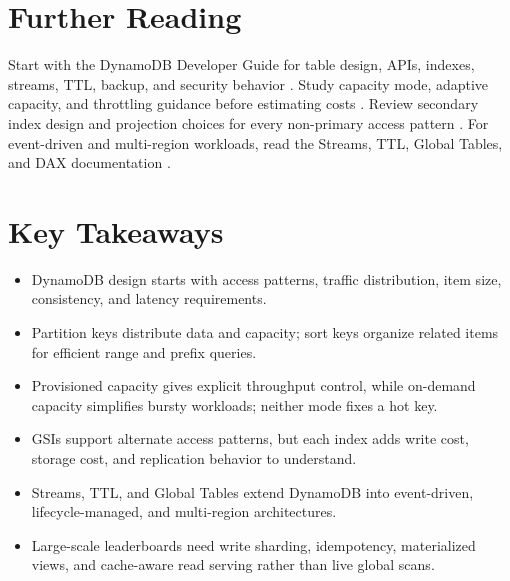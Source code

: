 \section{Further Reading}
Start with the DynamoDB Developer Guide for table design, APIs, indexes, streams, TTL, backup, and security behavior \cite{awsDynamoDBDeveloperGuide}. Study capacity mode, adaptive capacity, and throttling guidance before estimating costs \cite{awsDynamoDBCapacity,awsDynamoDBBestPractices}. Review secondary index design and projection choices for every non-primary access pattern \cite{awsDynamoDBSecondaryIndexes}. For event-driven and multi-region workloads, read the Streams, TTL, Global Tables, and DAX documentation \cite{awsDynamoDBStreamsTTL,awsDynamoDBGlobalTables,awsDynamoDBDAX}.

\section*{Key Takeaways}
\begin{itemize}
    \item DynamoDB design starts with access patterns, traffic distribution, item size, consistency, and latency requirements.
    \item Partition keys distribute data and capacity; sort keys organize related items for efficient range and prefix queries.
    \item Provisioned capacity gives explicit throughput control, while on-demand capacity simplifies bursty workloads; neither mode fixes a hot key.
    \item GSIs support alternate access patterns, but each index adds write cost, storage cost, and replication behavior to understand.
    \item Streams, TTL, and Global Tables extend DynamoDB into event-driven, lifecycle-managed, and multi-region architectures.
    \item Large-scale leaderboards need write sharding, idempotency, materialized views, and cache-aware read serving rather than live global scans.
\end{itemize}

